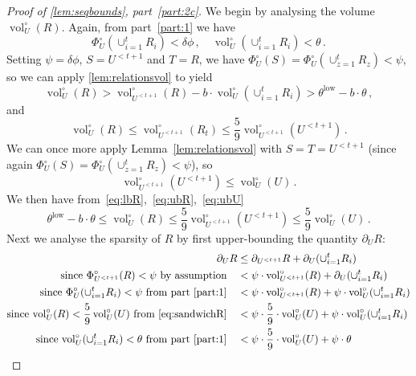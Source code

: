 \documentclass[epsfig,letter,11pt]{article}
\numberwithin{equation}{section}
\newcommand{\unvolc}[2]{\operatorname{vol}_{#2}^\circ (#1)}
\newcommand{\unspc}[2]{\Phi_{#2}^\circ (#1)}
\newcommand{\uncut}[2]{{\partial}_{#2} #1}
\DeclareMathOperator*{\low}{low}
\begin{document}
 \begin{proof}[Proof of \cref{lem:seqbounds}, part~\eqref{part:2c}]
	We begin by analysing the volume $\unvolc{R}{U}$. Again, from part~\eqref{part:1} we have
	\begin{equation*}
		\unspc{\cup_{i=1}^{t} R_i}{U} < \delta \phi\, , \quad \unvolc{\cup_{i=1}^{t} R_i}{U} < \theta \,.
	\end{equation*}
	Setting $\psi = \delta \phi$, $S=U^{<t+1}$ and $T=R$,  we have $\unspc{S}{U} = \unspc{\cup_{z=1}^t R_z}{U} < \psi$, so we can apply \cref{lem:relationsvol} to yield
	\begin{equation} \label{eq:lbR}
		\unvolc{R}{U} > \unvolc{R}{U^{<t+1}} - b \cdot \unvolc{\cup_{i=1}^{t} R_i}{U} > \theta^{\low}-b \cdot \theta \, ,
	\end{equation}
	and
	\begin{equation}  \label{eq:ubR}
		\unvolc{R}{U} \le \unvolc{R_t}{U^{<t+1}} \le \frac{5}{9}\unvolc{U^{<t+1}}{U^{<t+1}} \, .
	\end{equation}
	We can once more apply Lemma~\ref{lem:relationsvol} with $S=T=U^{<t+1}$ (since again $\unspc{S}{U} = \unspc{\cup_{z=1}^t R_z}{U} < \psi$), so
	\begin{equation}
		 \label{eq:ubU}
		\unvolc{U^{<t+1}}{U^{<t+1}} \le \unvolc{U}{U} \, .
	\end{equation}
	We then have from~\eqref{eq:lbR},~\eqref{eq:ubR},~\eqref{eq:ubU}
	\begin{equation}
		\label{eq:sandwichR}
		 \theta^{\low}-b \cdot \theta \le \unvolc{R}{U} \le  \frac{5}{9}\unvolc{U^{<t+1}}{U^{<t+1}} \le  \frac{5}{9}\unvolc{U}{U} \, .
	\end{equation}
	Next we analyse the sparsity of $R$ by first upper-bounding the quantity $\uncut{R}{U}$:
	\begin{align}
		\uncut{R}{U} & \le {\uncut{R}{U^{<t+1}}+\uncut{(\cup_{i =1}^{t}R_i)}{U}} \\
		\text{since $\unspc{R}{U^{<t+1}} <\psi$ by assumption}\quad& < {\psi \cdot \unvolc{R}{U^{<t+1}}+\uncut{(\cup_{i =1}^{t}R_i)}{U}}\\
		\text{since $\unspc{\cup_{i =1}^{t}R_i}{U} <\psi$ from part~\eqref{part:1}} \quad & < {\psi \cdot \unvolc{R}{U^{<t+1}}+\psi \cdot \unvolc{\cup_{i =1}^{t}R_i}{U}} \\
		\text{since $\unvolc{R}{U} < \frac{5}{9}\unvolc{U}{U}$ from~\eqref{eq:sandwichR}} \quad& < {\psi \cdot  \frac{5}{9} \cdot \unvolc{U}{U}+\psi \cdot \unvolc{\cup_{i =1}^{t}R_i}{U}}\\
		\text{since $\unvolc{\cup_{i =1}^{t}R_i}{U}< \theta $ from  part~\eqref{part:1}}\quad & < \psi \cdot  \frac{5}{9} \cdot \unvolc{U}{U}+\psi \cdot \theta  \\

\end{align}
\end{proof}
\end{document}
